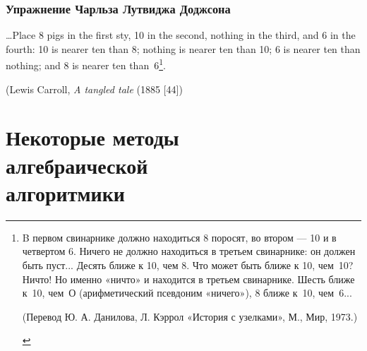 \documentclass{../../template/mai_book}
\begin{document}
    \subsection{\normalsize{Упражнение Чарльза Лутвиджа Доджсона}}
    { \ldots Place 8 pigs in the first sty, 10 in the second, nothing in the third, and 6 in the fourth: 10 is nearer ten than 8; nothing is nearer ten than 10; 6 is nearer ten than nothing; and 8 is nearer ten than~6\footnote{B первом свинарнике должно находиться 8 поросят, во втором — 10 и в четвертом 6. Ничего не должно находиться в третьем свинарнике: он должен быть пуст... Десять ближе к 10, чем 8. Что может быть ближе к 10, чем~10? Ничто! Но именно «ничто» и находится в третьем свинарнике. Шесть ближе к~10, чем~О (арифметический псевдоним «ничего»), 8 ближе к~10, чем~6...
    \begin{flushright} (Перевод Ю. А. Данилова, Л. Кэррол «История с узелками», М., Мир, 1973.)\end{flushright}}.

    \begin{flushright} (Lewis Carroll, \textit {A tangled tale} (1885 [44])\end{flushright}}

    \setcounter{section}{0}

    \chapter[Некоторые методы алгебраической алгоритмики]{Некоторые методы \\ алгебраической \\ алгоритмики}
    \thispagestyle{empty}
\end{document}
